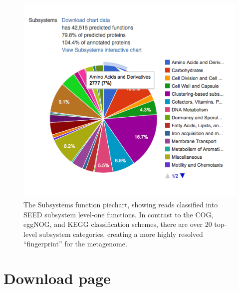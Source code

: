 \documentclass[12pt,fullpage]{report}
\begin{document}
\begin{figure}
\begin{center}
\includegraphics[width=6in]{Images/subsystems-functions-piechart.png}
\end{center}
\caption{
The \gls{Subsystem}s function piechart, showing reads classified into SEED subsystem level-one functions. In contrast to the COG, eggNOG, and KEGG classification schemes, there are over 20 top-level subsystem categories, creating a more highly resolved ``fingerprint'' for the metagenome.
}
\label{fig:subsystems-functions-piechart}
\end{figure}




\section{Download page}
\end{document}
